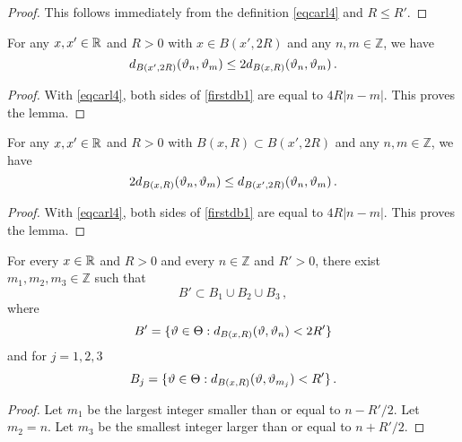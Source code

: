 {\begin{proof}
    This follows immediately from the definition \eqref{eqcarl4} and $R \le R'$.
\end{proof}

\begin{lemma}
\label{frequency-ball-doubling}
  For any $x,x'\in {\mathbb{R}}$ and $R>0$ with
   $x\in B(x',2R)$  and any $n,m\in \mathbb{Z}$, we have
\begin{equation}\label{firstdb1}
    d_{B(x',2R)}({\vartheta}_n,{\vartheta}_m)\le 2 d_{B(x,R)}({\vartheta}_n,{\vartheta}_m) \, .
\end{equation}
\end{lemma}
\begin{proof}
With \eqref{eqcarl4}, both sides of \eqref{firstdb1} are equal to $4R|n-m|$. This proves the lemma.
\end{proof}

\begin{lemma}
\label{frequency-ball-growth}
    For any $x,x'\in {\mathbb{R}}$ and $R>0$ with
   $B(x,R)\subset B(x',2R)$  and any $n,m\in \mathbb{Z}$, we have
\begin{equation}\label{seconddb1}
    2d_{B(x,R)}({\vartheta}_n,{\vartheta}_m)\le  d_{B(x',2R)}({\vartheta}_n,{\vartheta}_m) \, .
\end{equation}
\end{lemma}
\begin{proof}
With \eqref{eqcarl4}, both sides of \eqref{firstdb1} are equal to $4R|n-m|$. This proves the lemma.
\end{proof}

\begin{lemma}
\label{integer-ball-cover}
    For every $x\in {\mathbb{R}}$ and $R>0$ and every
    $n\in \mathbb{Z}$ and $R'>0$,
    there exist $m_1, m_2, m_3\in \mathbb{Z}$
    such that
    \begin{equation}\label{eqcarl5}
        B'\subset B_1\cup B_2\cup B_3\, ,
    \end{equation}
where
\begin{equation}
B'=     \{ {\vartheta} \in {\Theta}: d_{B(x,R)}({\vartheta}, {\vartheta}_n)<2R'\}
\end{equation}
and for $j=1,2,3$
\begin{equation}
  B_j=
     \{ {\vartheta} \in {\Theta}: d_{B(x,R)}({\vartheta}, {\vartheta}_{m_j})<R'\}
     \, .
\end{equation}

\end{lemma}
\begin{proof}
Let $m_1$ be the largest integer smaller than
or equal to
$n-R'/2$.
Let $m_2=n$.
Let $m_3$ be the smallest integer larger than
or equal to $n+R'/2$.


\end{proof}}
